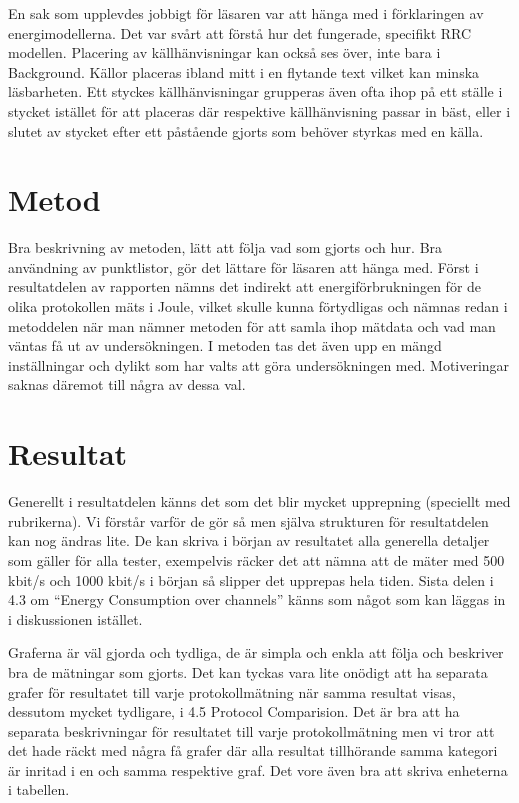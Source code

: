 \documentclass{article}
\begin{document}
En sak som upplevdes jobbigt för läsaren var att hänga med i förklaringen av energimodellerna. Det var svårt att förstå hur det fungerade, specifikt RRC modellen. 
Placering av källhänvisningar kan också ses över, inte bara i Background. Källor placeras ibland mitt i en flytande text vilket kan minska läsbarheten. Ett styckes källhänvisningar grupperas även ofta ihop på ett ställe i stycket istället för att placeras där respektive källhänvisning passar in bäst, eller i slutet av stycket efter ett påstående gjorts som behöver styrkas med en källa.

\section{Metod}
Bra beskrivning av metoden, lätt att följa vad som gjorts och hur. Bra användning av punktlistor, gör det lättare för läsaren att hänga med. Först i resultatdelen av rapporten nämns det indirekt att energiförbrukningen för de olika protokollen mäts i Joule, vilket skulle kunna förtydligas och nämnas redan i metoddelen när man nämner metoden för att samla ihop mätdata och vad man väntas få ut av undersökningen.
I metoden tas det även upp en mängd inställningar och dylikt som har valts att göra undersökningen med. Motiveringar saknas däremot till några av dessa val.


\section{Resultat}
Generellt i resultatdelen känns det som det blir mycket upprepning (speciellt med rubrikerna). Vi förstår varför de gör så men själva strukturen för resultatdelen kan nog ändras lite. De kan skriva i början av resultatet alla generella detaljer som gäller för alla tester, exempelvis räcker det att nämna att de mäter med 500 kbit/s och 1000 kbit/s i början så slipper det upprepas hela tiden. Sista delen i 4.3 om “Energy Consumption over channels” känns som något som kan läggas in i diskussionen istället.

Graferna är väl gjorda och tydliga, de är simpla och enkla att följa och beskriver bra de mätningar som gjorts. Det kan tyckas vara lite onödigt att ha separata grafer för resultatet till varje protokollmätning när samma resultat visas, dessutom mycket tydligare, i 4.5 Protocol Comparision. Det är bra att ha separata beskrivningar för resultatet till varje protokollmätning men vi tror att det hade räckt med några få grafer där alla resultat tillhörande samma kategori är inritad i en och samma respektive graf. Det vore även bra att skriva enheterna i tabellen.
\end{document}
